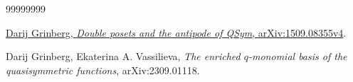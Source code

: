 \documentclass[numbers=enddot,12pt,final,onecolumn,notitlepage]{scrartcl}%
\theoremstyle{definition}
\begin{document}
\begin{thebibliography}{99999999}                                                                                         %


\href{https://arxiv.org/abs/1509.08355v4}{Darij
Grinberg, \textit{Double posets and the antipode of QSym}, arXiv:1509.08355v4}.

Darij Grinberg, Ekaterina A. Vassilieva, \textit{The
enriched $q$-monomial basis of the quasisymmetric functions}, arXiv:2309.01118.
\end{thebibliography}
\end{document}
